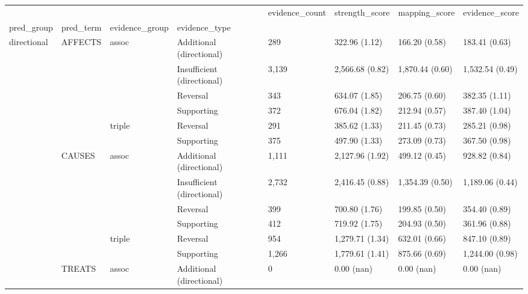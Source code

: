 \begin{tabular}{llllllll}
\toprule
              &                &        &            & evidence\_count &   strength\_score &    mapping\_score &   evidence\_score \\
pred\_group & pred\_term & evidence\_group & evidence\_type &                &                  &                  &                  \\
\midrule
directional & AFFECTS & assoc & Additional (directional) &            289 &    322.96 (1.12) &    166.20 (0.58) &    183.41 (0.63) \\
              &                &        & Insufficient (directional) &          3,139 &  2,566.68 (0.82) &  1,870.44 (0.60) &  1,532.54 (0.49) \\
              &                &        & Reversal &            343 &    634.07 (1.85) &    206.75 (0.60) &    382.35 (1.11) \\
              &                &        & Supporting &            372 &    676.04 (1.82) &    212.94 (0.57) &    387.40 (1.04) \\
              &                & triple & Reversal &            291 &    385.62 (1.33) &    211.45 (0.73) &    285.21 (0.98) \\
              &                &        & Supporting &            375 &    497.90 (1.33) &    273.09 (0.73) &    367.50 (0.98) \\
              & CAUSES & assoc & Additional (directional) &          1,111 &  2,127.96 (1.92) &    499.12 (0.45) &    928.82 (0.84) \\
              &                &        & Insufficient (directional) &          2,732 &  2,416.45 (0.88) &  1,354.39 (0.50) &  1,189.06 (0.44) \\
              &                &        & Reversal &            399 &    700.80 (1.76) &    199.85 (0.50) &    354.40 (0.89) \\
              &                &        & Supporting &            412 &    719.92 (1.75) &    204.93 (0.50) &    361.96 (0.88) \\
              &                & triple & Reversal &            954 &  1,279.71 (1.34) &    632.01 (0.66) &    847.10 (0.89) \\
              &                &        & Supporting &          1,266 &  1,779.61 (1.41) &    875.66 (0.69) &  1,244.00 (0.98) \\
              & TREATS & assoc & Additional (directional) &              0 &       0.00 (nan) &       0.00 (nan) &       0.00 (nan) \\

\end{tabular}
